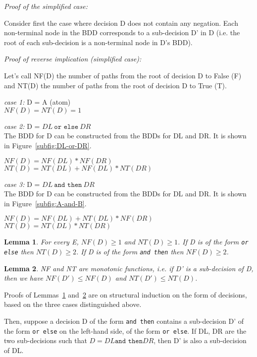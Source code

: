 \documentclass[a4paper,12pt,twoside]{article}
\renewcommand{\le}{\leqslant}
\renewcommand{\ge}{\geqslant}
\newcommand{\andthen}{\texttt{and then}}
\newcommand{\orelse}{\texttt{or else}}
\newtheorem{lemma}{Lemma}[subsection]
\begin{document}
\emph{Proof of the simplified case:}

Consider first the case where decision D does not contain any negation.
Each non-terminal node in the BDD corresponds to a sub-decision D' in D
(i.e. the root of each sub-decision is a non-terminal node in D's BDD).

\emph{Proof of reverse implication (simplified case):}

Let's call NF(D) the number of paths from the root of decision D to False (F)
and NT(D) the number of paths from the root of decision D to True (T).

\emph{case 1:} D = A (atom)\\
$NF(D) = NT(D) = 1$

\emph{case 2:} D = $DL \ \orelse{} \ DR$\\
The BDD for D can be constructed from the BDDs for DL and DR. It is shown 
in Figure~\ref{subfig:DL-or-DR}.


$NF(D) = NF(DL) * NF(DR)$\\
$NT(D) = NT(DL) + NF(DL) * NT(DR)$

\emph{case 3:} D = $DL \ \andthen{} \ DR$\\
The BDD for D can be constructed from the BDDs for DL and DR. It is shown 
in Figure~\ref{subfig:A-and-B}.

$NF(D) = NF(DL) + NT(DL) * NF(DR)$\\
$NT(D) = NT(DL) * NT(DR)$

\begin{lemma}
\label{lemma:NF-NT-bound}
For every E, $NF(D) \ge 1$ and $NT(D) \ge 1$.
If D is of the form \orelse{} then $NT(D) \ge 2$.
If D is of the form \andthen{} then $NF(D) \ge 2$.
\end{lemma}

\begin{lemma}
\label{lemma:NF-NT-monotonic}
NF and NT are monotonic functions, i.e. if D' is a sub-decision of D,
then we have
        $NF(D') \le NF(D)$
and        
        $NT(D') \le NT(D)$.
\end{lemma}

Proofs of Lemmas~\ref{lemma:NF-NT-bound} and~\ref{lemma:NF-NT-monotonic} are on
structural induction on the form of decisions, based on the three cases
distinguished above.

Then, suppose a decision D of the form \andthen{} contains a
sub-decision D' of the form \orelse{} on the left-hand side, of the form
\orelse{}. If DL, DR are the two sub-decisions such that
$D = DL \andthen{} DR$, then D' is also a sub-decision of DL.
\end{document}
